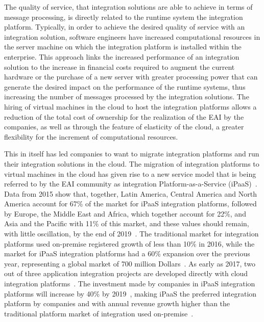 The quality of service, that integration solutions are able to achieve in terms of message processing, is directly related to the runtime system the integration platform. Typically, in order to achieve the desired quality of service with an integration solution, software engineers have increased computational resources in the server machine on which the integration platform is installed within the enterprise. This approach links the increased performance of an integration solution to the increase in financial costs required to augment the current hardware or the purchase of a new server with greater processing power that can generate the desired impact on the performance of the runtime systems, thus increasing the number of messages processed by the integration solutions.
The hiring of virtual machines in the cloud to host the integration platforms allows a reduction of the total cost of ownership for the realization of the EAI by the companies, as well as through the feature of elasticity of the cloud, a greater flexibility for the increment of computational resources.

This in itself has led companies to want to migrate integration platforms and run their integration solutions in the cloud. The migration of integration platforms to virtual machines in the cloud has given rise to a new service model that is being referred to by the EAI community as integration Platform-as-a-Service (iPaaS)~\cite{pezzini2011}. Data from 2015 show that, together, Latin America, Central America and North America account for 67\% of the market for iPaaS integration platforms, followed by Europe, the Middle East and Africa, which together account for 22\%, and Asia and the Pacific with 11\% of this market, and these values should remain, with little oscillation, by the end of 2019~\cite{sharma2015}. The traditional market for integration platforms used on-premise registered growth of less than 10\% in 2016, while the market for iPaaS integration platforms had a 60\% expansion over the previous year, representing a global market of 700 million Dollars~\cite{guttridge2017}. As early as 2017, two out of three application integration projects are developed directly with cloud integration platforms~\cite{pezzini2015}. The investment made by companies in iPaaS integration platforms will increase by 40\% by 2019~\cite{sharma2015}, making iPaaS the preferred integration platform by companies and with annual revenue growth higher than the traditional platform market of integration used on-premise~\cite{guttridge2017,sharma2017}.

